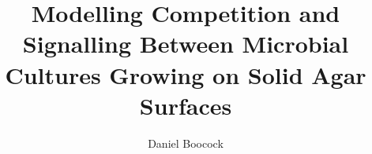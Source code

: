 

\title{Modelling Competition and Signalling Between Microbial Cultures Growing on Solid Agar Surfaces}
\author{Daniel Boocock}


\maketitle
\thispagestyle{title}
\noindent\makebox[\linewidth]{\rule{\textwidth}{0.4pt}}

\begin{multicols}{2}








\end{multicols}



